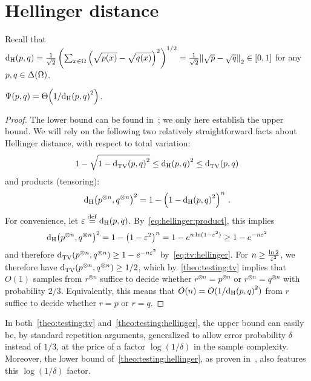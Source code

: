 \documentclass[10pt]{article}
\begin{document}
\section{Hellinger distance}

Recall that ${\operatorname{d_{\rm{}H}}\!\left({p, q}\right)} = \frac{1}{\sqrt{2}}\left(\sum_{x\in\Omega} \left(\sqrt{p(x)}-\sqrt{q(x)}\right)^2\right)^{1/2} = \frac{1}{\sqrt{2}}{\lVert\sqrt{p}-\sqrt{q}{\rVert}}_2\in[0,1]$ for any $p,q\in\Delta\!\left(\Omega\right)$. 

\begin{theorem}\label{theo:testing:hellinger}
  $\Psi(p,q) = \bigTheta{1/\hellinger{p}{q}^2}$.
\end{theorem}
\begin{proof}
  The lower bound can be found in~\cite[Theorem 4.7]{BarYossef:02}; we only here establish the upper bound. We will rely on the following two relatively straightforward facts about Hellinger distance, with respect to total variation:
  \begin{equation}\label{eq:tv:hellinger}
    1-\sqrt{1-{\operatorname{d}_{\rm TV}^{}\!\left({p, q}\right)}^2} \leq {\operatorname{d_{\rm{}H}}\!\left({p, q}\right)}^2 \leq {\operatorname{d}_{\rm TV}^{}\!\left({p, q}\right)}
  \end{equation}
 and products (tensoring):
\begin{equation}\label{eq:hellinger:product}
{\operatorname{d_{\rm{}H}}\!\left({p^{\otimes n}, q^{\otimes n}}\right)}^2 = 1 - \left(1-{\operatorname{d_{\rm{}H}}\!\left({p, q}\right)}^2\right)^n\,.
\end{equation}
For convenience, let $\varepsilon\stackrel{\rm def}{=} {\operatorname{d_{\rm{}H}}\!\left({p, q}\right)}$. By~\eqref{eq:hellinger:product}, this implies 
\[
    {\operatorname{d_{\rm{}H}}\!\left({p^{\otimes n}, q^{\otimes n}}\right)}^2 = 1 - \left(1-\varepsilon^2\right)^n = 1-e^{n\ln(1-\varepsilon^2)}  \geq 1-e^{-n\varepsilon^2}
\]
and therefore ${\operatorname{d}_{\rm TV}^{}\!\left({p^{\otimes n}, q^{\otimes n}}\right)} \geq 1-e^{-n\varepsilon^2}$ by~\eqref{eq:tv:hellinger}. For $n\geq \frac{\ln 2}{\varepsilon^2}$, we therefore have ${\operatorname{d}_{\rm TV}^{}\!\left({p^{\otimes n}, q^{\otimes n}}\right)} \geq 1/2$, which by~\autoref{theo:testing:tv} implies that $O(1)$ samples from $r^{\otimes n}$ suffice to decide whether $r^{\otimes n}=p^{\otimes n}$ or $r^{\otimes n}=q^{\otimes n}$ with probability $2/3$. Equivalently, this means that $O(n) = O(1/{\operatorname{d_{\rm{}H}}\!\left({p, q}\right)}^2)$ from $r$ suffice to decide whether $r=p$ or $r=q$.  
  \end{proof}
\begin{remark}
  In both~\autoref{theo:testing:tv} and~\autoref{theo:testing:hellinger}, the upper bound can easily be, by standard repetition arguments, generalized to allow error probability $\delta$ instead of $1/3$, at the price of a factor $\log(1/\delta)$ in the sample complexity. Moreover, the lower bound of~\autoref{theo:testing:hellinger}, as proven in~\cite[Theorem 4.7]{BarYossef:02}, also features this $\log(1/\delta)$ factor.
\end{remark}
\end{document}
